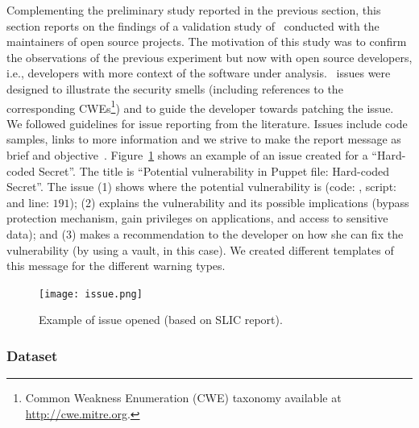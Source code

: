 \sloppy
Complementing the preliminary study reported in the previous section,
this section reports on the findings of a validation study of
\slic\ conducted with the maintainers of open source projects. The
motivation of this study was to confirm the observations of the 
previous experiment but now with open source developers, i.e., 
developers with more context of the software under analysis.  
\github\ issues 
were designed to
illustrate the security smells (including references to the corresponding
CWEs\footnote{Common Weakness Enumeration (CWE) taxonomy available at
\url{http://cwe.mitre.org}.}) and to guide the developer towards
patching the issue. We followed guidelines for issue reporting from
the literature. Issues include code samples, links to more
information and we strive to make the report message as brief and
objective~\cite{carvalho2020c}. Figure~\ref{fig:issue} shows an
example of an issue created for a ``Hard-coded Secret''. The title is
``Potential vulnerability in Puppet file: Hard-coded Secret''. The
issue (1) shows where the potential vulnerability is (code:
, script:
 and line: $191$); (2)
explains the vulnerability and its possible implications (bypass
protection mechanism, gain privileges on applications, and access to
sensitive data); and (3) makes a recommendation to the developer on
how she can fix the vulnerability (by using a vault, in this
case). We created different templates of this message for the
different warning types.

\begin{figure}[t!]
  \centering
  \texttt{[image: issue.png]}
  \vspace{-4ex}  
  \caption{Example of issue opened (based on SLIC report).}\label{fig:issue}
  \vspace{-3ex}
\end{figure}
%

%
\subsubsection{Dataset}

